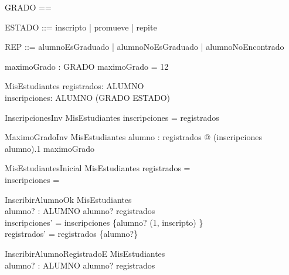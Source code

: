 \begin{zed}
    [ALUMNO]
\end{zed}
\begin{zed}
    GRADO == \nat
\end{zed}
\begin{zed}
    ESTADO ::= inscripto | promueve | repite
\end{zed}
\begin{zed}
    REP ::= alumnoEsGraduado | alumnoNoEsGraduado | alumnoNoEncontrado
\end{zed}

\begin{axdef}
    maximoGrado : GRADO
\where
    maximoGrado = 12
\end{axdef}

\begin{schema}{MisEstudiantes}
    registrados: \power ALUMNO \\
    inscripciones: ALUMNO \pfun (GRADO \cross ESTADO)
\end{schema}

\begin{schema}{InscripcionesInv}
    MisEstudiantes
    \where
    \dom inscripciones = registrados
\end{schema}

\begin{schema}{MaximoGradoInv}
    MisEstudiantes
    \where
    \forall alumno : registrados @ (inscripciones alumno).1 \leq maximoGrado
\end{schema}

\begin{schema}{MisEstudiantesInicial}
    MisEstudiantes
    \where
    registrados = \emptyset \\
    inscripciones = \emptyset
\end{schema}

\begin{schema}{InscribirAlumnoOk}
    \Delta MisEstudiantes \\
    alumno? : ALUMNO
    \where
    alumno? \notin registrados \\
    inscripciones' = inscripciones \cup \{alumno? \mapsto (1, inscripto) \} \\
    registrados' = registrados \cup \{alumno?\}
\end{schema}

\begin{schema}{InscribirAlumnoRegistradoE}
    \Xi MisEstudiantes \\
    alumno? : ALUMNO
    \where
    alumno? \in registrados
\end{schema}

